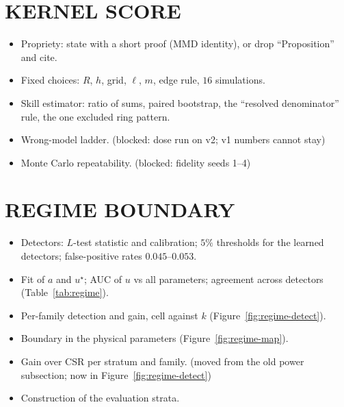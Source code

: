 \documentclass[twoside]{article}
\begin{document}
\section{KERNEL SCORE}
\label{app:score}

\begin{itemize}
  \item Propriety: state with a short proof (MMD identity), or drop ``Proposition'' and cite.
  \item Fixed choices: $R$, $h$, grid, $\ell$, $m$, edge rule, $16$ simulations.
  \item Skill estimator: ratio of sums, paired bootstrap, the ``resolved denominator'' rule, the one excluded ring pattern.
  \item Wrong-model ladder. (blocked: dose run on v2; v1 numbers cannot stay)
  \item Monte Carlo repeatability. (blocked: fidelity seeds 1--4)
\end{itemize}

\section{REGIME BOUNDARY}
\label{app:regime}

\begin{itemize}
  \item Detectors: $L$-test statistic and calibration; $5\%$ thresholds for the learned detectors; false-positive rates $0.045$--$0.053$.
  \item Fit of $a$ and $u^\star$; AUC of $u$ vs all parameters; agreement across detectors (Table~\ref{tab:regime}).
  \item Per-family detection and gain, cell against $k$ (Figure~\ref{fig:regime-detect}).
  \item Boundary in the physical parameters (Figure~\ref{fig:regime-map}).
  \item Gain over CSR per stratum and family. (moved from the old power subsection; now in Figure~\ref{fig:regime-detect})
  \item Construction of the evaluation strata.
\end{itemize}
\end{document}
